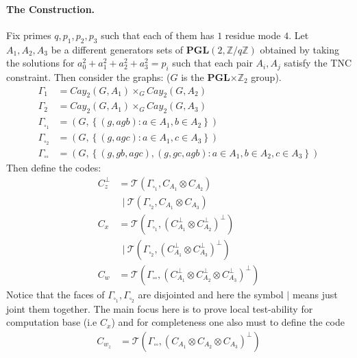 \documentclass{article}
\begin{document}
\begin{multicols*}{2}
  \paragraph{The Construction.} Fix primes $q,p_1,p_2,p_3$ such that each of them has $1 $ residue mode $4$. Let $A_{1},A_{2},A_{3}$ be a different generators sets of $ \mathbf{PGL}(2 , \mathbb{Z} / q\mathbb{Z} )  $ 
  obtained by taking the solutions for $a_{0}^{2} + a_{1}^{2} +a_{2}^{2} +a_{3}^{2} = p_i $ such that each pair $A_i,A_j$ satisfy the 
  TNC constraint. Then consider the graphs: ($G$ is the \textbf{PGL}$\times \mathbb{Z}_2$ group).  
  \begin{equation*}
    \begin{split}
      \Gamma_{1}  &= Cay_{2}\left(  G, A_{1} \right)\times_{G} Cay_{2}\left(  G, A_{2} \right) \\
      \Gamma_{2}  &= Cay_{2}\left(  G, A_{1} \right)\times_{G} Cay_{2}\left(  G, A_{3} \right) \\
      \Gamma_{\square_{1}} &= \left( G, \left\{ \left( g, agb \right) : a \in A_{1}, b \in A_{2} \right\}  \right) \\
      \Gamma_{\square_{2}} &= \left( G, \left\{ \left( g, agc \right) : a \in A_{1}, c \in A_{3} \right\}  \right) \\
      \Gamma_{\square \square} &= \left( G, \left\{ \left( g, gb, agc \right), \left( g, gc, agb \right) :
      a \in A_{1}, b \in A_{2}, c \in A_{3} \right\}  \right) 
    \end{split}
  \end{equation*}
   Then define the codes:
	\begin{equation*}
	  \begin{split}
	    C_{z}^{\perp} & = \mathcal{T}\left( \Gamma_{\square_{1}}, C_{A_1} \otimes  C_{A_2}  \right) \\
	    & \ \ | \ \mathcal{T}\left(  \Gamma_{\square_{2}}, C_{A_1} \otimes C_{A_3}  \right) \\
	    C_{x} &=  \mathcal{T}\left(  \Gamma_{\square_{1}}, \left(  C_{A_1}^{\perp} \otimes C_{A_2}^{\perp} \right)^{\perp}  \right) \\
	    & \ \ | \ \mathcal{T}\left( \Gamma_{\square_{2}}, \left(  C_{A_1}^{\perp} \otimes C_{A_3}^{\perp} \right)^{\perp}  \right) \\
	    C_{w} &=  \mathcal{T}\left( \Gamma_{\square \square}, \left(  C_{A_1}^{\perp} \otimes C_{A_2}^{\perp} \otimes C_{A_3}^{\perp} \right)^{\perp}  \right)   
	  \end{split}
	\end{equation*}
	Notice that the faces of $\Gamma_{\square_{1}},\Gamma_{\square_{2}}$ are disjointed and here the symbol $|$ means just joint them together. 
	The main focus here is to prove local test-ability for computation base (i.e $C_{x}$) and for completeness one also must to define the code 
	\begin{equation*}
	  \begin{split}
	    C_{w_{z}} &=  \mathcal{T}\left( \Gamma_{\square \square}, \left(  C_{A_1} \otimes C_{A_2} \otimes C_{A_3} \right)^{\perp}  \right)   
	  \end{split}
	\end{equation*}

\end{multicols*}
\end{document}
